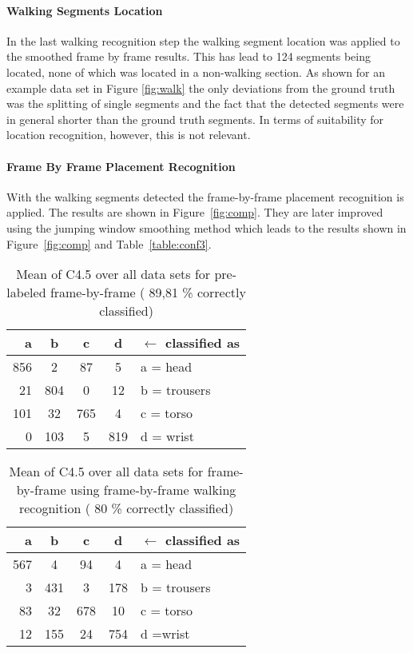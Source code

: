 \paragraph{Walking Segments Location}
In the last walking recognition step the walking segment location was
applied to the smoothed frame by frame results. This has lead to 124
segments being located, none of which was located in a non-walking
section. As shown for an example data set in Figure \ref{fig:walk} the
only deviations from the ground truth was the splitting of single
segments and the fact that the detected segments were in general
shorter than the ground truth segments. In terms of suitability for
location recognition, however, this is not relevant.


\paragraph{Frame By Frame Placement Recognition}
\label{fbf}
With the walking segments detected the frame-by-frame placement recognition is
applied. The results are shown in Figure~\ref{fig:comp}. They are later improved using
the jumping window smoothing method which  leads to the results
shown in Figure~\ref{fig:comp} and Table~\ref{table:conf3}. 

\begin{table}[h]
\caption[Mean confusion matrix, frame by frame]{Mean of C4.5 over all data sets for pre-labeled frame-by-frame ( 89,81 \% correctly classified)}
\begin{center}
\begin{tabular}{|r c c c l|}\midrule
a	&b	&c	&d	&$\gets$ classified as\\\midrule
856	&2	&87	&5	&a = head\\
21	&804	&0	&12	&b = trousers\\
101	&32	&765	&4	&c = torso\\
0	&103	&5	&819	&d = wrist\\
\bottomrule
\end{tabular}
\label{table:conf}
\end{center}
\end{table}

\begin{table}[h]
\caption[Mean confusion matrix, frame by frame with segmentation]{Mean of C4.5 over all data sets for frame-by-frame using frame-by-frame walking recognition ( 80 \% correctly classified)}
\begin{center}
\begin{tabular}{|r c c c l|}\midrule
a	&b	&c	&d	& $\gets$ classified as\\\midrule
567	&4	&94	&4	&a = head\\
3	&431	&3	&178	&b = trousers\\
83	&32	&678	&10	&c = torso\\
12	&155	&24	&754	&d =wrist\\
\bottomrule
\end{tabular}
\label{table:conf2}
\end{center}
\end{table}

